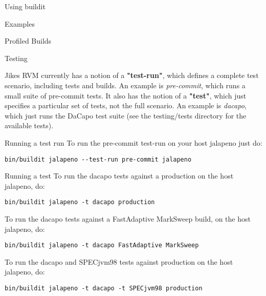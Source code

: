 \begin{section}{Using buildit}
\begin{subsection}{Examples}
\begin{subsubsection}{Profiled Builds}
\end{subsubsection}

\begin{subsubsection}{Testing}

Jikes RVM currently has a notion of a \textbf{"test-run"}, which defines a complete test scenario, including tests and builds.  An example is \textit{pre-commit}, which runs a small suite of pre-commit tests.  It also has the notion of a \textbf{"test"}, which just specifies a particular set of tests, not the full scenario.  An example is \textit{dacapo}, which just runs the DaCapo test suite (see the testing/tests directory for the available tests).

\end{subsubsection}

\begin{subsubsection}{Running a test run}
To run the pre-commit test-run on your host jalapeno just do:

\begin{lstlisting}
bin/buildit jalapeno --test-run pre-commit jalapeno
\end{lstlisting}

\end{subsubsection}

\begin{subsubsection}{Running a test}
To run the dacapo tests against a production on the host jalapeno, do:

\begin{lstlisting}
bin/buildit jalapeno -t dacapo production
\end{lstlisting}

To run the dacapo tests against a FastAdaptive MarkSweep build, on the host jalapeno, do:

\begin{lstlisting}
bin/buildit jalapeno -t dacapo FastAdaptive MarkSweep
\end{lstlisting}

To run the dacapo and SPECjvm98 tests against production on the host jalapeno, do:

\begin{lstlisting}
bin/buildit jalapeno -t dacapo -t SPECjvm98 production
\end{lstlisting}

\end{subsubsection}

\end{subsection}

\end{section}
